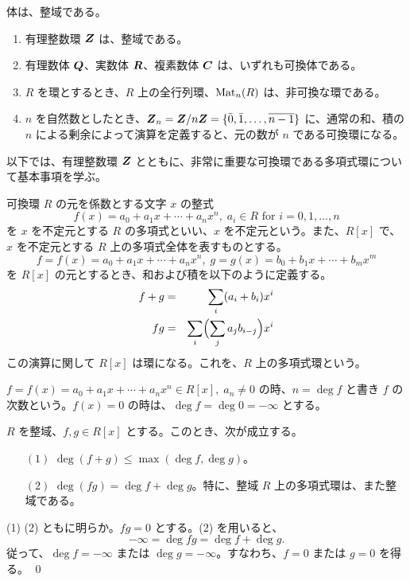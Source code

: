 \note 体は、整域である。

\begin{eg}
\begin{enumerate}
\item 有理整数環 $\mbox{\boldmath $Z$}$ は、整域である。
\item 有理数体 $\mbox{\boldmath $Q$}$、実数体 $\mbox{\boldmath $R$}$、複素数体 $\mbox{\boldmath $C$}$ は、いずれも可換体である。
\item $R$ を環とするとき、$R$ 上の全行列環、$\mbox{{\rm Mat}}_n(R)$ は、非可換な環である。
\item $n$ を自然数としたとき、$\mbox{\boldmath $Z$}_n = \mbox{\boldmath $Z$}/n\mbox{\boldmath $Z$} = \{\bar{0}, \bar{1}, \ldots, \overline{n-1}\}$ に、通常の和、積の $n$ による剰余によって演算を定義すると、元の数が $n$ である可換環になる。
\end{enumerate}
\end{eg}

以下では、有理整数環 $\mbox{\boldmath $Z$}$ とともに、非常に重要な可換環である多項式環について基本事項を学ぶ。

可換環 $R$ の元を係数とする文字 $x$ の整式
$$f(x) = a_0 + a_1x + \cdots + a_nx^n, \;a_i\in R \mbox{ for } i = 0,1,\ldots, n$$
を $x$ を不定元とする $R$ の多項式といい、$x$ を不定元という。また、$R[x]$ で、$x$ を不定元とする $R$ 上の多項式全体を表すものとする。
$$f = f(x) = a_0 + a_1x + \cdots + a_nx^n, \;g = g(x) = b_0 + b_1x + \cdots + b_mx^m$$
を $R[x]$ の元とするとき、和および積を以下のように定義する。
\begin{eqnarray*}
f + g  & = & \sum_i (a_i + b_i)x^i\\
fg & = & \sum_i\Bigl(\sum_ja_jb_{i-j}\Bigr)x^i
\end{eqnarray*}
この演算に関して $R[x]$ は環になる。これを、$R$ 上の多項式環という。

\smallskip
$f = f(x) = a_0 + a_1x + \cdots + a_nx^n \in R[x], \;a_n\neq 0$ の時、$n = \deg f$ と書き $f$ の次数という。$f(x) = 0$ の時は、$\deg f = \deg 0 = -\infty$ とする。

\begin{prop}
$R$ を整域、$f, g\in R[x]$ とする。このとき、次が成立する。
\begin{itemize}
\item[$(1)$] $\deg(f+g) \leq \max(\deg f, \deg g)$。
\item[$(2)$] $\deg(fg) = \deg f + \deg g$。特に、整域 $R$ 上の多項式環は、また整域である。
\end{itemize}
\end{prop}
\proof
(1) (2) ともに明らか。$fg = 0$ とする。(2) を用いると、
$$-\infty = \deg fg = \deg f + \deg g.$$
従って、$\deg f = -\infty$ または $\deg g = -\infty$。すなわち、$f = 0$ または $g = 0$ を得る。
\qed

